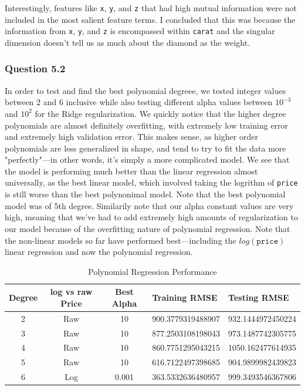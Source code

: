 \documentclass[11pt,letterpaper]{article}
\begin{document}
Interestingly, features like \texttt{x}, \texttt{y}, and \texttt{z} that had high mutual information 
were not included in the most salient feature terms. I concluded that this was because 
the information from \texttt{x}, \texttt{y}, and \texttt{z} is encompassed within 
\texttt{carat} and the singular dimension doesn't tell us as much about the diamond 
as the weight. 


\subsubsection*{Question 5.2}
In order to test and find the best polynomial degreee, we tested integer values between 2 and 6 inclusive while 
also testing different alpha values between $10^{-3}$ and $10^2$ for the Ridge regularization. We quickly notice that the higher degree polynomials 
are almost definitely overfitting, with extremely low training error and extremely high validation error.
This makes sense, as higher order polynomials are less generalized in shape, and tend to try to fit the data 
more "perfectly"—in other words, it's simply a more complicated model. We see that the model is performing much better than 
the linear regression almost universally, as the best linear model, which involved taking the logrithm of \texttt{price} 
is still worse than the best polynonimal model. Note that the best polynomial model was of 5th degree. Similarily note that 
our alpha constant values are very high, meaning that we've had to add extremely high amounts of regularization to our model because of the
overfitting nature of polynomial regression. Note that the non-linear models so far have performed best—including the  $log(\texttt{price})$ 
linear regression and now the polynomial regression. 

\begin{table}[H]
    \centering
        \label{table1} 
        \begin{tabular}{cccll} 
        \hline
        Degree & log vs raw Price & Best Alpha & Training RMSE & Testing RMSE \\
        \hline 
        2 & Raw & 10 & 900.3779319488907 & 932.1444972450224 \\
        3 & Raw & 10& 877.2503108198043 & 973.1487742305775 \\
        4 & Raw & 10 & 860.7751295043215 & 1050.162477614935\\
        5 & Raw & 10 & 616.7122497398685 & 904.9899982439823\\
        6 & Log & 0.001 & 363.5332636480957 & 999.3493546367806
        \end{tabular}
        \caption{Polynomial Regression Performance}
        \end{table}
\end{document}

